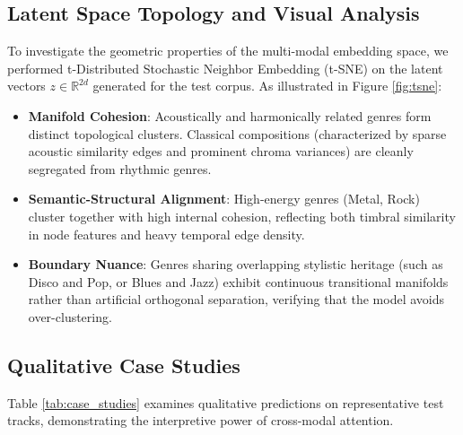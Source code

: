 \documentclass{article}
\begin{document}
\subsection{Latent Space Topology and Visual Analysis}
To investigate the geometric properties of the multi-modal embedding space, we performed t-Distributed Stochastic Neighbor Embedding (t-SNE) on the latent vectors $z \in \mathbb{R}^{2d}$ generated for the test corpus. As illustrated in Figure \ref{fig:tsne}:
\begin{itemize}
    \item \textbf{Manifold Cohesion}: Acoustically and harmonically related genres form distinct topological clusters. Classical compositions (characterized by sparse acoustic similarity edges and prominent chroma variances) are cleanly segregated from rhythmic genres.
    \item \textbf{Semantic-Structural Alignment}: High-energy genres (Metal, Rock) cluster together with high internal cohesion, reflecting both timbral similarity in node features and heavy temporal edge density.
    \item \textbf{Boundary Nuance}: Genres sharing overlapping stylistic heritage (such as Disco and Pop, or Blues and Jazz) exhibit continuous transitional manifolds rather than artificial orthogonal separation, verifying that the model avoids over-clustering.
\end{itemize}

\subsection{Qualitative Case Studies}
Table \ref{tab:case_studies} examines qualitative predictions on representative test tracks, demonstrating the interpretive power of cross-modal attention.
\end{document}
